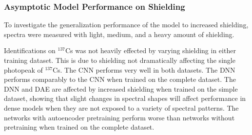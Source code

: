 \subsubsection{Asymptotic Model Performance on Shielding}

To investigate the generalization performance of the model to increased shielding, spectra were measured with light, medium, and a heavy amount of shielding. 

Identifications on $^{137}$Cs was not heavily effected by varying shielding in either training dataset. This is due to shielding not dramatically affecting the single photopeak of $^{137}$Cs. The CNN performs very well in both datasets. The DNN performs comparably to the CNN when trained on the complete dataset. The DNN and DAE are affected by increased shielding when trained on the simple dataset, showing that slight changes in spectral shapes will affect performance in dense models when they are not exposed to a variety of spectral patterns. The networks with autoencoder pretraining perform worse than networks without pretraining when trained on the complete dataset.


